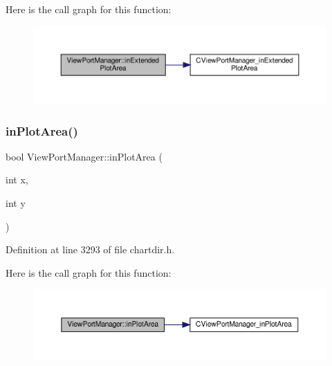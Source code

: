Here is the call graph for this function\+:
\nopagebreak
\begin{figure}[H]
\begin{center}
\leavevmode
\includegraphics[width=350pt]{class_view_port_manager_a11b9ed53c57b96be9ef663200b64be87_cgraph}
\end{center}
\end{figure}
\mbox{\label{class_view_port_manager_ae347d881f810430cc0b8a368c4a349c2}} 
\subsubsection{\texorpdfstring{in\+Plot\+Area()}{inPlotArea()}}
{\footnotesize\ttfamily bool View\+Port\+Manager\+::in\+Plot\+Area (\begin{DoxyParamCaption}\item[{int}]{x,  }\item[{int}]{y }\end{DoxyParamCaption})\hspace{0.3cm}{\ttfamily [inline]}}



Definition at line 3293 of file chartdir.\+h.

Here is the call graph for this function\+:
\nopagebreak
\begin{figure}[H]
\begin{center}
\leavevmode
\includegraphics[width=350pt]{class_view_port_manager_ae347d881f810430cc0b8a368c4a349c2_cgraph}
\end{center}
\end{figure}
\mbox{\label{class_view_port_manager_af4bdc161db91ed516987f6a358f02bab}} 
